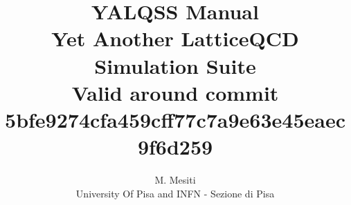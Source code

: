 \documentclass[a4paper,10pt]{scrartcl}
\title{{\Huge \bfseries YALQSS Manual} \\
Yet Another LatticeQCD Simulation Suite \\
{\small Valid around commit 
5bfe9274cfa459cff77c7a9e63e45eaec9f6d259
}}
\author{M. Mesiti\\{\small University Of Pisa and INFN - Sezione di Pisa}}
\begin{document}
\maketitle
\date{}
 

  

  
 
  
  
%  
\end{document}

